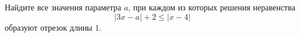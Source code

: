 \begin{ex}
	\begin{condition}
		Найдите все значения параметра \( a \), при каждом из которых решения неравенства \[ |3x-a|+2\le|x-4| \] образуют отрезок длины 1.
	\end{condition}
\end{ex}